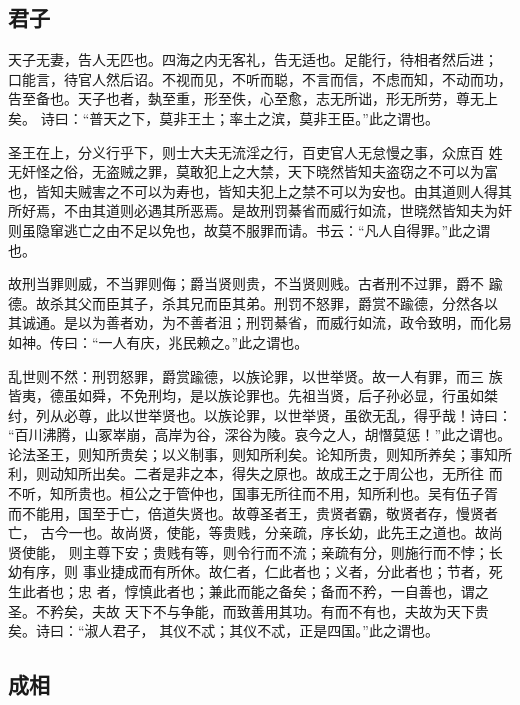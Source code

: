 \documentclass[]{article}
\begin{document}
\hypertarget{header-n104}{%
\subsection{君子}\label{header-n104}}

天子无妻，告人无匹也。四海之内无客礼，告无适也。足能行，待相者然后进；
口能言，待官人然后诏。不视而见，不听而聪，不言而信，不虑而知，不动而功，
告至备也。天子也者，埶至重，形至佚，心至愈，志无所诎，形无所劳，尊无上矣。
诗曰：``普天之下，莫非王土；率土之滨，莫非王臣。''此之谓也。

圣王在上，分义行乎下，则士大夫无流淫之行，百吏官人无怠慢之事，众庶百
姓无奸怪之俗，无盗贼之罪，莫敢犯上之大禁，天下晓然皆知夫盗窃之不可以为富
也，皆知夫贼害之不可以为寿也，皆知夫犯上之禁不可以为安也。由其道则人得其
所好焉，不由其道则必遇其所恶焉。是故刑罚綦省而威行如流，世晓然皆知夫为奸
则虽隐窜逃亡之由不足以免也，故莫不服罪而请。书云：``凡人自得罪。''此之谓
也。

故刑当罪则威，不当罪则侮；爵当贤则贵，不当贤则贱。古者刑不过罪，爵不
踰德。故杀其父而臣其子，杀其兄而臣其弟。刑罚不怒罪，爵赏不踰德，分然各以
其诚通。是以为善者劝，为不善者沮；刑罚綦省，而威行如流，政令致明，而化易
如神。传曰：``一人有庆，兆民赖之。''此之谓也。

乱世则不然：刑罚怒罪，爵赏踰德，以族论罪，以世举贤。故一人有罪，而三
族皆夷，德虽如舜，不免刑均，是以族论罪也。先祖当贤，后子孙必显，行虽如桀
纣，列从必尊，此以世举贤也。以族论罪，以世举贤，虽欲无乱，得乎哉！诗曰：
``百川沸腾，山冢崒崩，高岸为谷，深谷为陵。哀今之人，胡憯莫惩！''此之谓也。
论法圣王，则知所贵矣；以义制事，则知所利矣。论知所贵，则知所养矣；事知所
利，则动知所出矣。二者是非之本，得失之原也。故成王之于周公也，无所往
而不听，知所贵也。桓公之于管仲也，国事无所往而不用，知所利也。吴有伍子胥
而不能用，国至于亡，倍道失贤也。故尊圣者王，贵贤者霸，敬贤者存，慢贤者亡，
古今一也。故尚贤，使能，等贵贱，分亲疏，序长幼，此先王之道也。故尚贤使能，
则主尊下安；贵贱有等，则令行而不流；亲疏有分，则施行而不悖；长幼有序，则
事业捷成而有所休。故仁者，仁此者也；义者，分此者也；节者，死生此者也；忠
者，惇慎此者也；兼此而能之备矣；备而不矜，一自善也，谓之圣。不矜矣，夫故
天下不与争能，而致善用其功。有而不有也，夫故为天下贵矣。诗曰：``淑人君子，
其仪不忒；其仪不忒，正是四国。''此之谓也。

\hypertarget{header-n108}{%
\subsection{成相}\label{header-n108}}
\end{document}
